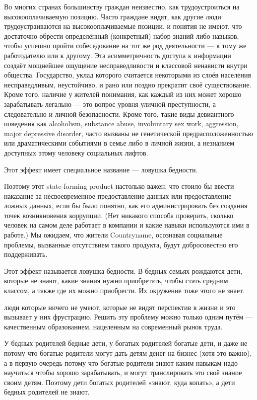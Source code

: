 \documentclass[11pt]{article}
\theoremstyle{remark}
\theoremstyle{definition}
\begin{document}
\color{blue}

Во многих странах большинству граждан неизвестно, как трудоустроиться на высокооплачиваемую позицию. Часто граждане видят, как другие люди трудоустраиваются на высокооплачиваемые позиции, и понятия не имеют, что достаточно обрести определённый (конкретный) набор знаний либо навыков, чтобы успешно пройти собеседование на тот же род деятельности --- к тому же работодателю или к другому. Эта асимметричность доступа к информации создаёт мощнейшее ощущение несправедливости и классовой ненависти внутри общества. Государство, уклад которого считается некоторыми из слоёв населения несправедливым, неустойчиво, и рано или поздно прекратит своё существование. Кроме того, наличие у жителей понимания, как каждый из них может хорошо зарабатывать легально --- это вопрос уровня уличной преступности, а следовательно и личной безопасности. Кроме того, такие виды девиантного поведения как alcoholism, substance abuse, involuntary sex work, aggression, major depressive disorder, часто вызваны не генетической предрасположенностью или драматическими событиями в семье либо в личной жизни, а незнанием доступных этому человеку социальных лифтов. 

Этот эффект имеет специальное название --- ловушка бедности. 

Поэтому этот state-forming product настолько важен, что стоило бы ввести наказание за несвоевременное предоставление данных или предоставление ложных данных, если бы было понятно, как его администрировать без создания точек возникновения коррупции. (Нет никакого способа проверить, сколько человек на самом деле работает в компании и какие навыки используются ими в работе.) Мы ожидаем, что жители Countryname, осознавая социальные проблемы, вызванные отсутствием такого продукта, будут добросовестно его поддерживать.


Этот эффект называется ловушка бедности. В бедных семьях рождаются дети, которые не знают, какие знания нужно приобретать, чтобы стать средним классом, а также где их можно приобрести. Их окружение тоже этого не знает.

люди которые ничего не умеют, которые не видят перспектив в жизни и это вызывает у них фрустрацию. Решить эту проблему можно только одним путём — качественным образованием, нацеленным на современный рынок труда. 

У бедных родителей бедные дети, у богатых родителей богатые дети, и даже не потому что богатые родители могут дать детям денег на бизнес (хотя это важно), а в первую очередь потому что богатые родители знают каким навыкам надо научиться чтобы хорошо зарабатывать, и могут транслировать это своё знание своим детям. Поэтому дети богатых родителей «знают, куда копать», а дети бедных родителей не знают.
\end{document}

